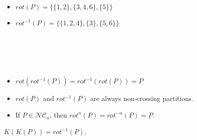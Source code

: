 \begin{example}[$P = \{\{1, 6\}, \{2, 3, 5\}, \{4\}\}$]
    ~
    \begin{itemize}
        \item $rot (P) = \{\{1, 2\}, \{3, 4, 6\}, \{5\}\}$
        \item $rot^{-1}(P) = \{\{1, 2, 4\}, \{3\}, \{5, 6\}\}$
    \end{itemize}
    \begin{center}
        
      ~\\
      ~\\
        
        
    \end{center}
\end{example}

\begin{rem}
    ~
    \begin{itemize}
        \item $rot (rot^{-1}(P)) = rot^{-1}(rot(P)) = P$
        \item $rot(P)$ and $rot^{-1}(P)$ are always
            non-crossing partitions.
        \item If $P \in \mathcal{NC}_n$, then $rot^n(P) =
            rot^{-n}(P) = P$.
    \end{itemize}
\end{rem}

\begin{prop}
    $K (K (P)) = rot^{-1} (P)$.
\end{prop}

\begin{example}[$P = \{\{1, 6\}, \{2, 3, 5\}, \{4\}\}$]
    ~
    \begin{center}
        
          ~\\
          ~\\
    
        
        
    \end{center}
\end{example}